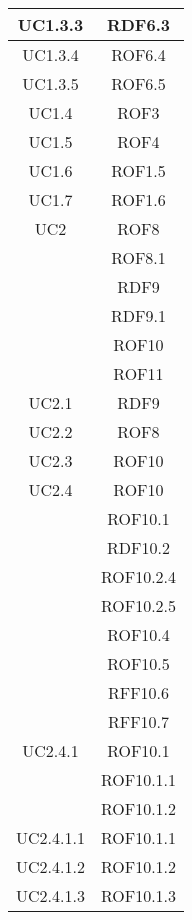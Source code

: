 \begin{longtable}{|c|c|}
\midrule
UC1.3.3
& RDF6.3\\

\midrule
UC1.3.4
& ROF6.4\\

\midrule
UC1.3.5
& ROF6.5\\

\midrule
UC1.4
& ROF3\\

\midrule
UC1.5
& ROF4\\

\midrule
UC1.6
& ROF1.5\\

\midrule
UC1.7
& ROF1.6\\


\midrule
UC2
& ROF8\\
& ROF8.1\\
& RDF9\\
& RDF9.1\\
& ROF10\\
& ROF11\\

\midrule
UC2.1
& RDF9\\

\midrule
UC2.2
& ROF8\\

\midrule
UC2.3
& ROF10\\

\midrule
UC2.4
& ROF10\\
& ROF10.1\\
& RDF10.2\\
& ROF10.2.4\\
& ROF10.2.5\\
& ROF10.4\\
& ROF10.5\\
& RFF10.6\\
& RFF10.7\\

\midrule
UC2.4.1
& ROF10.1\\
& ROF10.1.1\\
& ROF10.1.2\\

\midrule
UC2.4.1.1
& ROF10.1.1\\

\midrule
UC2.4.1.2
& ROF10.1.2\\

\midrule
UC2.4.1.3
& ROF10.1.3\\


\end{longtable}

